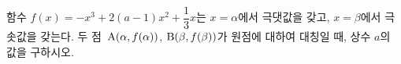 함수 $f(x)=-x^3+2(a-1)x^2+\dfrac{1}{3}x$는 $x=\alpha$에서 극댓값을 갖고, $x=\beta$에서 극솟값을 갖는다. 두 점~$\mathrm{A}(\alpha{,}\mkern3mu\mathopen{}f(\alpha))$, $\mathrm{B}(\beta{,}\mkern3mu\mathopen{}f(\beta))$가 원점에 대하여 대칭일 때, 상수 $a$의 값을 구하시오.
